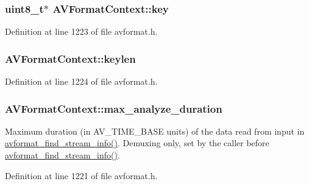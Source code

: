 \subsubsection[{\texorpdfstring{key}{key}}]{ {\bf uint8\+\_\+t}$\ast$ A\+V\+Format\+Context\+::key}\hypertarget{struct_a_v_format_context_a19cb4471ba011fc7adc5e17344c608f5}{}\label{struct_a_v_format_context_a19cb4471ba011fc7adc5e17344c608f5}


Definition at line 1223 of file avformat.\+h.

\subsubsection[{\texorpdfstring{keylen}{keylen}}]{ A\+V\+Format\+Context\+::keylen}\hypertarget{struct_a_v_format_context_a1f2c1db3070cc100938eaed81ff3767d}{}\label{struct_a_v_format_context_a1f2c1db3070cc100938eaed81ff3767d}


Definition at line 1224 of file avformat.\+h.

\subsubsection[{\texorpdfstring{max\+\_\+analyze\+\_\+duration}{max_analyze_duration}}]{ A\+V\+Format\+Context\+::max\+\_\+analyze\+\_\+duration}\hypertarget{struct_a_v_format_context_aa1f733fdfa1655d9e6ccc80f6b926274}{}\label{struct_a_v_format_context_aa1f733fdfa1655d9e6ccc80f6b926274}
Maximum duration (in A\+V\+\_\+\+T\+I\+M\+E\+\_\+\+B\+A\+SE units) of the data read from input in \hyperlink{group__lavf__decoding_gad42172e27cddafb81096939783b157bb}{avformat\+\_\+find\+\_\+stream\+\_\+info()}. Demuxing only, set by the caller before \hyperlink{group__lavf__decoding_gad42172e27cddafb81096939783b157bb}{avformat\+\_\+find\+\_\+stream\+\_\+info()}. 

Definition at line 1221 of file avformat.\+h.

